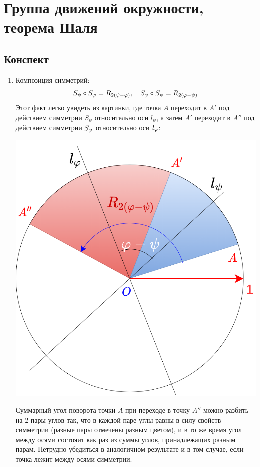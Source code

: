 \section{Группа движений окружности, теорема Шаля}

\subsection{Конспект}
\begin{enumerate}\setlength{\itemsep}{1pt}
\item Композиция симметрий: 
$$
S_\psi\circ S_\varphi=R_{2(\psi-\varphi)},\quad S_\varphi\circ S_\psi=R_{2(\varphi-\psi)}
$$
Этот факт легко увидеть из картинки, где точка $A$ переходит в $A'$ под действием симметрии $S_\psi$ относительно оси $l_\psi$, а затем $A'$ переходит в $A''$ под действием симметрии $S_\varphi$ относительно оси $l_\varphi$:

\begin{center}
\includegraphics[scale=0.25]{Rund.png}
\end{center}

Суммарный угол поворота точки $A$ при переходе в точку $A''$ можно разбить на 2 пары углов так, что в каждой паре углы равны в силу свойств симметрии (разные пары отмечены разным цветом), и в то же время угол между осями состояит как раз из суммы углов, принадлежащих разным парам. Нетрудно убедиться в аналогичном результате и в том случае, если точка лежит между осями симметрии.


\end{enumerate}
